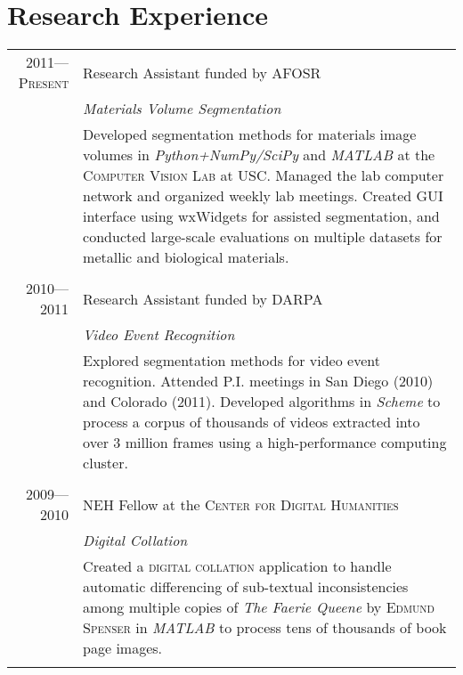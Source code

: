 \documentclass[10pt]{article}
\begin{document}
\newcommand{\experience}[4]{
\textsc{#1} & #2 \\
\nopagebreak &\emph{#3}\\
\nopagebreak &\footnotesize{#4} \\
\nopagebreak \multicolumn{2}{c}{} \\ [-1ex]
}

\section{Research Experience}
\begin{longtable}{@{}r|p{14cm}}

\experience{2011---Present}%
{Research Assistant funded by \textsc{AFOSR}}%
{Materials Volume Segmentation}%
{Developed segmentation methods for materials image
  volumes in \emph{Python+NumPy/SciPy} and \emph{MATLAB} at the
  \textsc{Computer Vision Lab} at \textsc{USC}. Managed the lab
  computer network and organized weekly lab meetings.  Created GUI
  interface using wxWidgets for assisted segmentation, and conducted
  large-scale evaluations on multiple datasets for metallic and
  biological materials.}

\experience{2010---2011}%
{Research Assistant funded by \textsc{DARPA}}%
{Video Event Recognition}%
{Explored segmentation methods for video event
  recognition. Attended P.I. meetings in San Diego (2010) and
  Colorado (2011). Developed algorithms in \emph{Scheme} to process
  a corpus of thousands of videos extracted into over 3 million
  frames using a high-performance computing cluster.}


\experience{2009---2010}%
{NEH Fellow at the \textsc{Center for Digital Humanities}}%
{Digital Collation}%
{Created a \textsc{digital collation} application to
  handle automatic differencing of sub-textual inconsistencies among
  multiple copies of \emph{The Faerie Queene} by \textsc{Edmund
    Spenser} in \emph{MATLAB} to process tens of thousands of book
  page images.}

\end{longtable}
\end{document}
